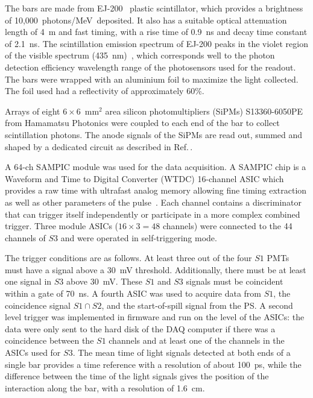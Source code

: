 The bars are made from EJ-200~\cite{SCIONIX} plastic scintillator, which provides a brightness of 10,000~photons/MeV~deposited.
It also has a suitable optical attenuation length of 4~m and fast timing, with a rise time of 0.9~ns and decay time constant of 2.1~ns.
The scintillation emission spectrum of EJ-200 peaks in the violet region of the visible spectrum (435~nm)~\cite{EJ200}, which corresponds well to the photon detection efficiency wavelength range of the photosensors used for the readout.
The bars were wrapped with an aluminium foil to maximize the light collected.
The foil used had a reflectivity of approximately 60\%.

Arrays of eight $6 \times 6$~mm$^2$ area silicon photomultipliers (SiPMs) S13360-6050PE from Hamamatsu Photonics \cite{Hamamatsu} were coupled to each end of the bar to collect scintillation photons.
The anode signals of the SiPMs are read out, summed and shaped by a dedicated circuit as described in Ref.\,\cite{S3-readout}.

A 64-ch SAMPIC  module was used for the data acquisition.
A SAMPIC chip is a Waveform and Time to Digital Converter (WTDC) 16-channel ASIC which provides a raw time with ultrafast analog memory allowing fine timing extraction as well as other parameters of the pulse~\cite{SAMPIC}.
Each channel contains a discriminator that can trigger itself independently or participate in a more complex combined trigger. 
Three module ASICs ($16\times3=48$ channels) were connected to the 44 channels of $\mathit{S3}$ and were operated in self-triggering mode.

The trigger conditions are as follows. At least three out of the four $\mathit{S1}$ PMTs must have a signal above a 30~mV threshold.
Additionally, there must be at least one signal in $\mathit{S3}$ above 30~mV.
These $\mathit{S1}$ and $\mathit{S3}$ signals must be coincident within a gate of 70~ns.
A fourth ASIC was used to acquire data from $\mathit{S1}$, the coincidence signal $\mathit{S1} \cap \mathit{S2}$, and the start-of-spill signal from the PS.
A second level trigger was implemented in firmware and run on the level of the ASICs: the data were only sent to the hard disk of the DAQ computer if there was a coincidence between the $\mathit{S1}$ channels and at least one of the channels in the ASICs used for $\mathit{S3}$.
The mean time of light signals detected at both ends of a single bar provides a time reference with a resolution of about 100~ps, while the difference between the time of the light signals gives the position of the interaction along the bar, with a resolution of 1.6~cm.

